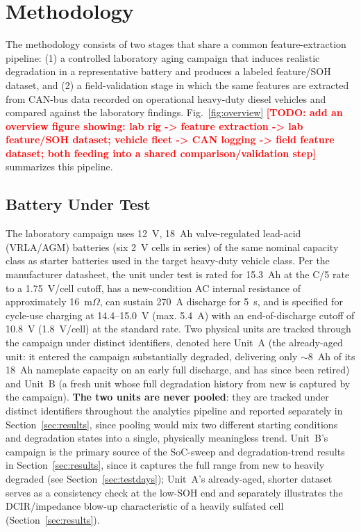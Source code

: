 \documentclass[conference]{IEEEtran}
\newcommand{\todo}[1]{\textcolor{red}{\textbf{[TODO: #1]}}}
\begin{document}
\section{Methodology}
\label{sec:method}

The methodology consists of two stages that share a common feature-extraction pipeline: (1) a controlled laboratory aging campaign that induces realistic degradation in a representative battery and produces a labeled feature/SOH dataset, and (2) a field-validation stage in which the same features are extracted from CAN-bus data recorded on operational heavy-duty diesel vehicles and compared against the laboratory findings. Fig.~\ref{fig:overview} \todo{add an overview figure showing: lab rig -> feature extraction -> lab feature/SOH dataset; vehicle fleet -> CAN logging -> field feature dataset; both feeding into a shared comparison/validation step} summarizes this pipeline.

\subsection{Battery Under Test}
\label{sec:battery}

The laboratory campaign uses 12~V, 18~Ah valve-regulated lead-acid (VRLA/AGM) batteries (six 2~V cells in series) of the same nominal capacity class as starter batteries used in the target heavy-duty vehicle class. Per the manufacturer datasheet, the unit under test is rated for 15.3~Ah at the C/5 rate to a 1.75~V/cell cutoff, has a new-condition AC internal resistance of approximately 16~m$\Omega$, can sustain 270~A discharge for 5~s, and is specified for cycle-use charging at 14.4--15.0~V (max. 5.4~A) with an end-of-discharge cutoff of 10.8~V (1.8~V/cell) at the standard rate. Two physical units are tracked through the campaign under distinct identifiers, denoted here Unit~A (the already-aged unit: it entered the campaign substantially degraded, delivering only $\sim$8~Ah of its 18~Ah nameplate capacity on an early full discharge, and has since been retired) and Unit~B (a fresh unit whose full degradation history from new is captured by the campaign). \textbf{The two units are never pooled}: they are tracked under distinct identifiers throughout the analytics pipeline and reported separately in Section~\ref{sec:results}, since pooling would mix two different starting conditions and degradation states into a single, physically meaningless trend. Unit~B's campaign is the primary source of the SoC-sweep and degradation-trend results in Section~\ref{sec:results}, since it captures the full range from new to heavily degraded (see Section~\ref{sec:testdays}); Unit~A's already-aged, shorter dataset serves as a consistency check at the low-SOH end and separately illustrates the DCIR/impedance blow-up characteristic of a heavily sulfated cell (Section~\ref{sec:results}).
\end{document}
